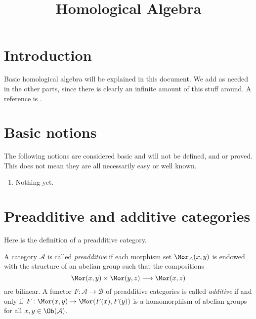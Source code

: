 

%


\title{Homological Algebra}


\maketitle

\label{section-phantom}

\tableofcontents

\section{Introduction}
\label{section-introduction}

\noindent
Basic homological algebra will be explained in this document.
We add as needed in the other parts, since there is clearly
an infinite amount of this stuff around.
A reference is \cite{Maclane}.

\section{Basic notions}
\label{section-topology-basic}

\noindent
The following notions are considered basic and will not be defined,
and or proved. This does not mean they are all necessarily easy or
well known.

\begin{enumerate}
\item Nothing yet.
\end{enumerate}




\section{Preadditive and additive categories}
\label{section-additive-categories}

\noindent
Here is the definition of a preadditive category.

\begin{definition}
\label{definition-preadditive}
A category $\mathcal{A}$ is called {\it preadditive} if each
morphism set $\Mor_\mathcal{A}(x, y)$ is endowed
with the structure of an abelian group such that the
compositions
$$
\Mor(x, y) \times \Mor(y, z)
\longrightarrow
\Mor(x, z)
$$
are bilinear. A functor $F : \mathcal{A} \to \mathcal{B}$ of
preadditive categories is called {\it additive} if and only
if $F : \Mor(x, y) \to \Mor(F(x), F(y))$
is a homomorphism of abelian groups for all
$x, y \in \Ob(\mathcal{A})$.
\end{definition}

